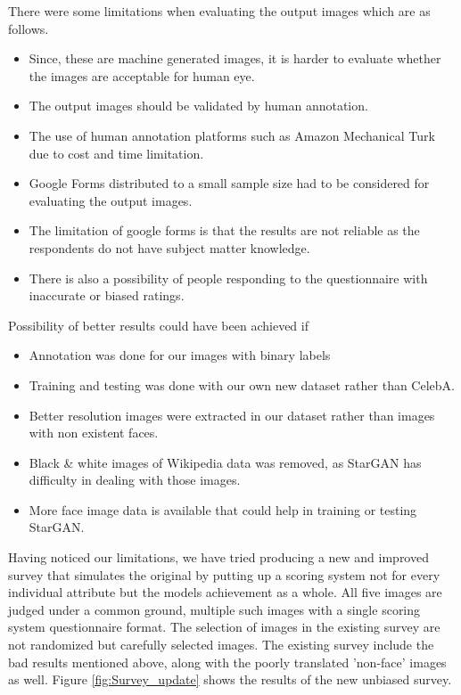 \documentclass[preprint,12pt]{elsarticle}
\begin{document}
There were some limitations when evaluating the output images which are as follows. 

\begin{itemize}
\item Since, these are machine generated images, it is harder to evaluate whether the images are acceptable for human eye.
\item The output images should be validated by human annotation.
\item The use of human annotation platforms such as Amazon Mechanical Turk due to cost and time limitation.
\item Google Forms distributed to a small sample size had to be considered for evaluating the output images.
\item The limitation of google forms is that the results are not reliable as the respondents do not have subject matter knowledge.
\item There is also a possibility of  people responding to the questionnaire with inaccurate or biased ratings.
\end{itemize}
\hfill \break
Possibility of better results could have been achieved if 
\begin{itemize}
    \item Annotation was done for  our images with binary labels 
    \item Training and testing was done  with our own new dataset rather than CelebA.
    \item Better resolution images were extracted in our dataset rather than images with non existent faces.
    \item Black \& white images of Wikipedia data was removed, as StarGAN has difficulty in dealing with those images. 
    \item More face image data is available that could help in training or testing StarGAN.
\end{itemize}

Having noticed our limitations, we have tried producing a new and improved survey that simulates the original by putting up a scoring system not for every individual attribute but the models achievement as a whole. All five images are judged under a common ground, multiple such images with a single scoring system questionnaire format. The selection of images in the existing survey are not randomized but carefully selected images. The existing survey include the bad results mentioned above, along with the poorly translated 'non-face' images as well. Figure \ref{fig:Survey_update} shows the results of the new unbiased survey.
\end{document}
